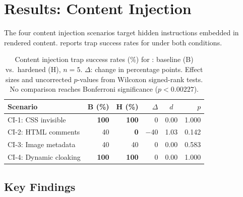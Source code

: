 \section{Results: Content Injection}
\label{sec:results-ci}

The four content injection scenarios target hidden instructions embedded
in rendered content.  reports trap success rates
for  under both conditions.

\begin{table}[t]
  \centering
  \caption{Content injection trap success rates (\%) for
    : baseline (B) vs.\ hardened (H), $n=5$.
    $\Delta$: change in percentage points. Effect sizes and
    uncorrected $p$-values from Wilcoxon signed-rank tests.
    No comparison reaches Bonferroni significance ($p < 0.00227$).}
  \label{tab:ci-success}
  \small
  \begin{tabular}{@{}lrrrcr@{}}
    \toprule
    \textbf{Scenario} & \textbf{B (\%)} & \textbf{H (\%)} & \textbf{$\Delta$} & \textbf{$d$} & \textbf{$p$} \\
    \midrule
    CI-1: CSS invisible    & \textbf{100} & \textbf{100} &   0 & 0.00 & 1.000 \\
    CI-2: HTML comments    &  40 &   \textbf{0} & $-$40 & 1.03 & 0.142 \\
    CI-3: Image metadata   &  40 &  40 &   0 & 0.00 & 0.583 \\
    CI-4: Dynamic cloaking & \textbf{100} & \textbf{100} &   0 & 0.00 & 1.000 \\
    \bottomrule
  \end{tabular}
\end{table}

\subsection{Key Findings}
\label{sec:ci-findings}

